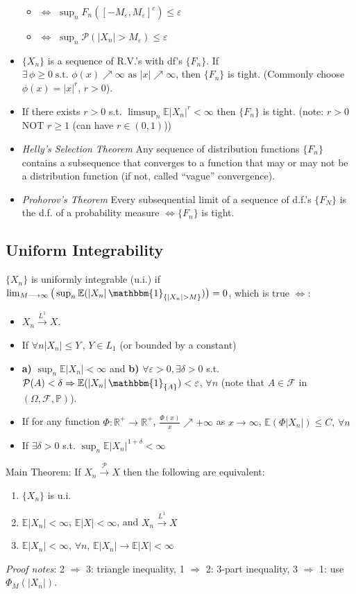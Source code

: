 \documentclass[11pt]{article}
\newcommand{\bbr}{\mathbb{R}}
\renewcommand{\P}{\mathbb{P}}
\newcommand{\bbp}{\mathbb{P}}
\newcommand{\eps}{\varepsilon}
\newcommand{\gd}{\delta}
\newcommand{\gf}{\phi}
\newcommand{\Gf}{\Phi}
\newcommand{\Go}{\Omega}
\newcommand\abs[1]{\left|#1\right|}
\newcommand{\ind}[1]{\mathbbm{1}_{\{#1\}}}
\renewcommand{\to}{\longrightarrow}
\newcommand{\pto}{\overset{\P}{\to}}
\newcommand{\Lp}[1]{\overset{L^#1}\to}
\newcommand{\pspace}{$(\Go,\mathcal{F},\bbp)$}
\renewcommand{\P}{\mathcal{P}}
\newcommand{\E}{\mathbb{E}}
\newcommand{\inquote}[1]{``#1''}
\newcommand{\imp}{\Rightarrow}
\newcommand{\seq}[1]{\{#1\}}
\begin{document}
\begin{multicols}{2}
\begin{itemize}
\begin{itemize}
\item $\iff$ $\sup_n F_n ( [-M_{\eps},M_{\eps}]^c) \leq \eps$
\item $\iff$ $\sup_n \P(\abs{X_n}>M_{\eps})\leq \eps$ 
\end{itemize}
\item $\seq{X_n}$ is a sequence of R.V.'s with df's $\seq{F_n}$.  If $\exists \, \gf \geq 0 \; \textrm{s.t. } \gf(x) \nearrow \infty \textrm{ as } \abs{x} \nearrow \infty$, then $\seq{F_n}$ is tight.  (Commonly choose $\gf(x) = \abs{x}^r$, $r>0$).
\item If there exists $r>0$ s.t. $\limsup_n \E\abs{X_n}^r < \infty$ then $\seq{F_n}$ is tight. (note: $r>0$ NOT $r\geq 1$ (can have $r \in (0,1)$))
\item \textit{Helly's Selection Theorem} Any sequence of distribution functions $\seq{F_n}$ contains a subsequence that converges to a function that may or may not be a distribution function (if not, called \inquote{vague} convergence).
\item \textit{Prohorov's Theorem} Every subsequential limit of a sequence of d.f.'s $\seq{F_N}$ is the d.f. of a probability measure $\iff \seq{F_n}$ is tight.
\end{itemize}
\subsection{Uniform Integrability}
$\{X_n\}$ is uniformly integrable (u.i.) if $\lim_{M \to \infty}\big(\sup_n \E( \abs{X_n}\ind{\abs{X_n}>M}) \big)=0$, which is true $\iff$:
\begin{itemize}
\item $X_n \Lp{1} X$.
\item If $ \forall n \abs{X_n} \leq Y \,$, $Y \in L_1$ (or bounded by a constant)
\item \textbf{a)} $\sup_n \E\abs{X_n} < \infty$ and \textbf{b)} $\forall \eps>0, \exists \gd>0$ s.t. $\P(A)<\gd \imp \E(\abs{X_n}\ind{A})<\eps$, $\forall n$ (note that $A \in \mathcal{F}$ in \pspace).
\item If for any function $\Gf: \bbr^+ \to \bbr^+$, $\frac{\Gf(x)}{x} \nearrow +\infty$ as $x \to \infty$, $\E(\Gf\abs{X_n}) \leq C, \, \forall n$
\item If $\exists \gd>0$ s.t. $\sup_n \E \abs{X_n}^{1+\gd}<\infty$
\end{itemize}
Main Theorem: If $X_n \pto X$ then the following are equivalent:
\begin{enumerate}
\item $\{X_n\}$ is u.i.
\item $\E \abs{X_n} < \infty$, $\E\abs{X}<\infty$, and $X_n \Lp{1} X$
\item $\E \abs{X_n} < \infty$, $\forall n$, $\E \abs{X_n} \to \E \abs{X}<\infty$
\end{enumerate}
\textit{Proof notes}: 2 $\imp$ 3: triangle inequality, 1 $\imp$ 2: 3-part inequality, 3 $\imp$ 1: use $\Gf_M(\abs{X_n})$.

\end{multicols}
\end{document}
